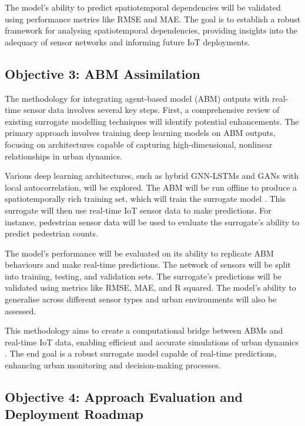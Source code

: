 The model’s ability to predict spatiotemporal dependencies will be validated using performance metrics like RMSE and MAE. The goal is to establish a robust framework for analysing spatiotemporal dependencies, providing insights into the adequacy of sensor networks and informing future IoT deployments.

\subsection{Objective 3: ABM Assimilation}

The methodology for integrating agent-based model (ABM) outputs with real-time sensor data involves several key steps. First, a comprehensive review of existing surrogate modelling techniques will identify potential enhancements. The primary approach involves training deep learning models on ABM outputs, focusing on architectures capable of capturing high-dimensional, nonlinear relationships in urban dynamics.

Various deep learning architectures, such as hybrid GNN-LSTMs and GANs with local autocorrelation, will be explored. The ABM will be run offline to produce a spatiotemporally rich training set, which will train the surrogate model \citep{kieuRealtimePredictionsUsing2022}. This surrogate will then use real-time IoT sensor data to make predictions. For instance, pedestrian sensor data will be used to evaluate the surrogate’s ability to predict pedestrian counts.

The model’s performance will be evaluated on its ability to replicate ABM behaviours and make real-time predictions. The network of sensors will be split into training, testing, and validation sets. The surrogate’s predictions will be validated using metrics like RMSE, MAE, and R squared. The model’s ability to generalise across different sensor types and urban environments will also be assessed.

This methodology aims to create a computational bridge between ABMs and real-time IoT data, enabling efficient and accurate simulations of urban dynamics \citep{heppenstallFutureDevelopmentsGeographical2021}. The end goal is a robust surrogate model capable of real-time predictions, enhancing urban monitoring and decision-making processes.


\subsection{Objective 4: Approach Evaluation and Deployment Roadmap}

